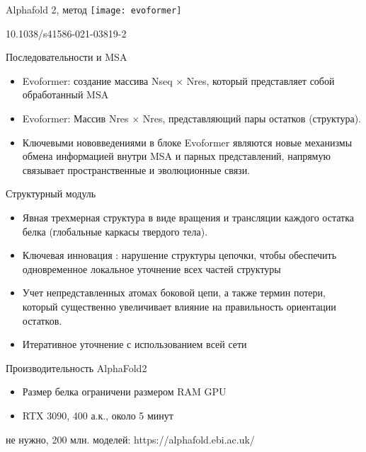 \begin{frame}
{Alphafold 2, метод }
\centering
		\texttt{[image: evoformer]}  

        \footnotesize 10.1038/s41586-021-03819-2

\end{frame}



\begin{frame}{Последовательности и MSA}
    \begin{itemize}
        \item Evoformer: создание массива Nseq × Nres, который представляет собой обработанный MSA
        \item Evoformer:  Массив Nres × Nres, представляющий пары остатков (структура).
        \item Ключевыми нововведениями в блоке Evoformer являются новые механизмы обмена информацией внутри MSA и парных представлений, напрямую
            связывает  пространственные и эволюционные связи.    
        \end{itemize}
    \end{frame}


\begin{frame}{Структурный модуль}
    \begin{itemize} 
        \item Явная трехмерная структура в виде вращения и трансляции каждого остатка белка 
            (глобальные каркасы твердого тела). 
        \item  Ключевая инновация : нарушение структуры цепочки, чтобы обеспечить одновременное локальное уточнение всех частей структуры
        \item Учет непредставленных атомах боковой цепи, а также термин потери, который существенно увеличивает влияние на правильность ориентации остатков.
        \item Итеративное уточнение с использованием всей сети 
    \end{itemize}
\end{frame}


\begin{frame}{Производительность AlphaFold2}
    \large
   \begin{itemize}
      \setlength\itemsep{1em}
       \item Размер белка ограничени размером RAM GPU
       \item RTX 3090, 400 а.к., около 5 минут
    \end{itemize}
    \vspace{1cm}
    не нужно, 200 млн. моделей: https://alphafold.ebi.ac.uk/
    
\end{frame}


